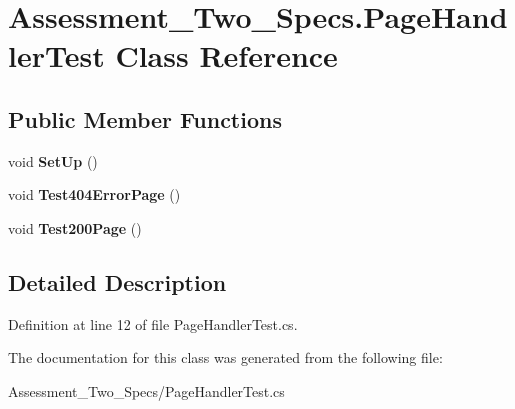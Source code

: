 \hypertarget{class_assessment___two___specs_1_1_page_handler_test}{
\section{Assessment\_\-Two\_\-Specs.PageHandlerTest Class Reference}
\label{class_assessment___two___specs_1_1_page_handler_test}
}
\subsection*{Public Member Functions}
\begin{DoxyCompactItemize}
\item 
\hypertarget{class_assessment___two___specs_1_1_page_handler_test_a86149b6455cb7e54531497093b8cd1b4}{
void {\bfseries SetUp} ()}
\label{class_assessment___two___specs_1_1_page_handler_test_a86149b6455cb7e54531497093b8cd1b4}

\item 
\hypertarget{class_assessment___two___specs_1_1_page_handler_test_aaedf7977ddfbb6f2b504a2d038e75879}{
void {\bfseries Test404ErrorPage} ()}
\label{class_assessment___two___specs_1_1_page_handler_test_aaedf7977ddfbb6f2b504a2d038e75879}

\item 
\hypertarget{class_assessment___two___specs_1_1_page_handler_test_aa82c46122737c817bcc293b64234494f}{
void {\bfseries Test200Page} ()}
\label{class_assessment___two___specs_1_1_page_handler_test_aa82c46122737c817bcc293b64234494f}

\end{DoxyCompactItemize}


\subsection{Detailed Description}


Definition at line 12 of file PageHandlerTest.cs.



The documentation for this class was generated from the following file:\begin{DoxyCompactItemize}
\item 
Assessment\_\-Two\_\-Specs/PageHandlerTest.cs\end{DoxyCompactItemize}
